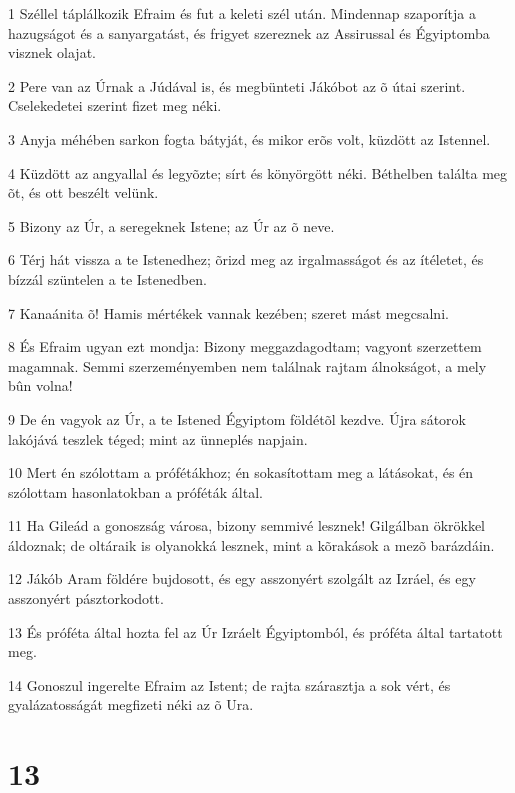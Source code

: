 \par 1 Széllel táplálkozik Efraim és fut a keleti szél után. Mindennap szaporítja a hazugságot és a sanyargatást, és frigyet szereznek az Assirussal és Égyiptomba visznek olajat.
\par 2 Pere van az Úrnak a Júdával is, és megbünteti Jákóbot az õ útai szerint. Cselekedetei szerint fizet meg néki.
\par 3 Anyja méhében sarkon fogta bátyját, és mikor erõs volt, küzdött  az Istennel.
\par 4 Küzdött az angyallal és legyõzte; sírt és könyörgött néki. Béthelben találta meg õt, és ott beszélt  velünk.
\par 5 Bizony az Úr, a seregeknek Istene; az Úr az õ neve.
\par 6 Térj hát vissza a te Istenedhez; õrizd meg az irgalmasságot és az ítéletet, és bízzál szüntelen a te Istenedben.
\par 7 Kanaánita õ! Hamis mértékek vannak kezében; szeret mást megcsalni.
\par 8 És Efraim ugyan ezt mondja: Bizony meggazdagodtam; vagyont szerzettem magamnak. Semmi szerzeményemben nem találnak rajtam álnokságot, a mely bûn volna!
\par 9 De én vagyok az Úr, a te Istened Égyiptom földétõl kezdve. Újra sátorok lakójává teszlek téged; mint az ünneplés napjain.
\par 10 Mert én szólottam a prófétákhoz; én sokasítottam meg a látásokat, és én szólottam hasonlatokban a próféták által.
\par 11 Ha Gileád a gonoszság városa, bizony semmivé lesznek! Gilgálban ökrökkel áldoznak; de oltáraik is olyanokká lesznek, mint a kõrakások a mezõ barázdáin.
\par 12 Jákób Aram földére bujdosott, és egy asszonyért szolgált az Izráel, és egy asszonyért pásztorkodott.
\par 13 És próféta által hozta fel az Úr Izráelt Égyiptomból, és próféta által tartatott meg.
\par 14 Gonoszul ingerelte Efraim az Istent; de rajta szárasztja a sok vért, és gyalázatosságát megfizeti néki az õ Ura.

\chapter{13}

